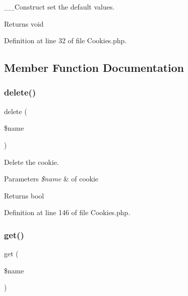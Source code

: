 \+\_\+\+\_\+\+Construct set the default values.

\begin{DoxyReturn}{Returns}
void 
\end{DoxyReturn}


Definition at line 32 of file Cookies.\+php.



\subsection{Member Function Documentation}
\mbox{\label{class_zest_1_1_cookies_1_1_cookies_af7c3ea3150164bc92700134803f277be}} 
\subsubsection{\texorpdfstring{delete()}{delete()}}
{\footnotesize\ttfamily delete (\begin{DoxyParamCaption}\item[{}]{\$name }\end{DoxyParamCaption})}

Delete the cookie.


\begin{DoxyParams}{Parameters}
{\em \$name} & of cookie\\
\hline
\end{DoxyParams}
\begin{DoxyReturn}{Returns}
bool 
\end{DoxyReturn}


Definition at line 146 of file Cookies.\+php.

\mbox{\label{class_zest_1_1_cookies_1_1_cookies_af5ea6a083ddb07beb8a30dd32e309ceb}} 
\subsubsection{\texorpdfstring{get()}{get()}}
{\footnotesize\ttfamily get (\begin{DoxyParamCaption}\item[{}]{\$name }\end{DoxyParamCaption})}


